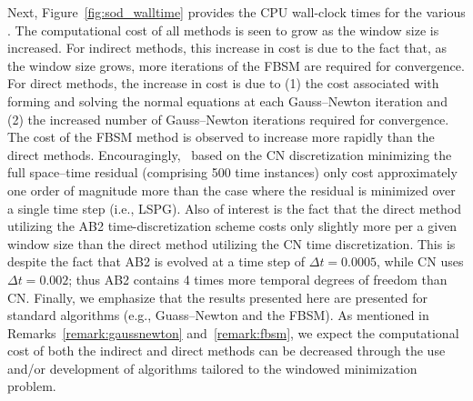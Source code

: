Next, Figure~\ref{fig:sod_walltime} provides the CPU wall-clock times for the various \methodAcronymROMs. The computational cost of all methods is seen to grow 
as the window size is increased. For indirect methods, this increase in cost is due to the fact that, as the window size 
grows, more iterations of the FBSM are required for convergence. For direct methods, the increase in cost is due to (1) the cost 
associated with forming and solving the normal equations at each Gauss--Newton iteration and (2) the increased number of 
Gauss--Newton iterations required for convergence. The cost of the FBSM method is observed to increase more rapidly 
than the direct methods. Encouragingly, \methodAcronymROMs\ based on the CN discretization
minimizing the full space--time residual (comprising 
500 time instances) only  
cost approximately one order of magnitude more than the case where the residual is minimized over a single time step (i.e., LSPG). Also of interest is the 
fact that the direct method utilizing the AB2 time-discretization scheme costs only slightly more per a given window size than the direct method 
utilizing the CN time discretization. This is despite the fact that AB2 is evolved at a time step of $\Delta t = 0.0005$, while CN uses $\Delta t = 0.002$; thus 
AB2 contains 4 times more temporal degrees of freedom than CN.  Finally, we emphasize that the 
results presented here are presented for standard algorithms (e.g., Guass--Newton and the FBSM). As mentioned in 
Remarks~\ref{remark:gaussnewton} and~\ref{remark:fbsm}, we expect the computational cost 
of both the indirect and direct methods can be decreased through the use and/or development of 
algorithms tailored to the windowed minimization problem. 


